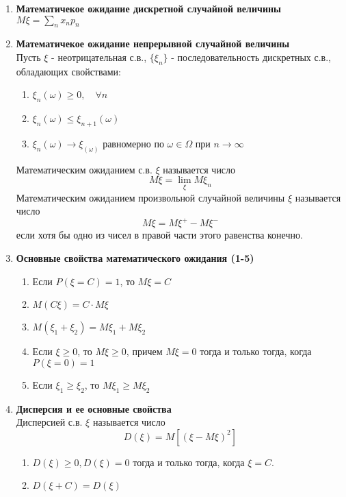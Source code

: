 \documentclass[A4]{article}
\begin{document}
\begin{enumerate}
	\item \textbf{Математичекое ожидание дискретной случайной величины}\\
	$M\xi=\sum_{n}x_np_n$
	\item \textbf{Математичекое ожидание непрерывной случайной величины}\\
	Пусть $\xi$ - неотрицательная с.в., $\{\xi_n\}$ - последовательность дискретных с.в., обладающих свойствами:
	\begin{enumerate}
		\item $\xi_n(\omega)\ge0,\quad \forall n$
		\item $\xi_n(\omega)\le\xi_{n+1}(\omega)$
		\item $\xi_n(\omega)\rightarrow\xi_(\omega) $ равномерно по $\omega\in\Omega $ при $n\rightarrow \infty$
	\end{enumerate} 
	Математическим ожиданием с.в. $\xi$ называется число
	\begin{equation}
	M\xi=\lim_{\xi}M\xi_n
	\end{equation}
	Математическим ожиданием произвольной случайной величины $\xi$ называется число 
	\begin{equation}
	M\xi=M\xi^+-M\xi^-
	\end{equation}
	если хотя бы одно из чисел в правой части этого равенства конечно.
	\item \textbf{Основные свойства математического ожидания (1-5)}\\
	\begin{enumerate}
		\item Если $P(\xi=C)=1$, то $M\xi=C$
		\item $M(C\xi)=C\cdot M\xi$
		\item $M(\xi_1+\xi_2)=M\xi_1+M\xi_2$
		\item Если $\xi\ge0$, то $M\xi\ge0$, причем $M\xi=0$ тогда и только тогда, когда $P(\xi=0)=1$
		\item Если $\xi_1\ge\xi_2$, то $M\xi_1\ge M\xi_2$ 
	\end{enumerate}
	\item \textbf{Дисперсия  и ее основные свойства}\\
	Дисперсией с.в. $\xi$ называется число
	\begin{equation}
	D(\xi)=M[(\xi-M\xi)^2]
	\end{equation}
	\begin{enumerate}
		\item $D(\xi)\ge0,D(\xi)=0$ тогда и только тогда, когда $\xi=C$.
		\item $D(\xi+C)=D(\xi)$

\end{enumerate}
\end{enumerate}
\end{document}
